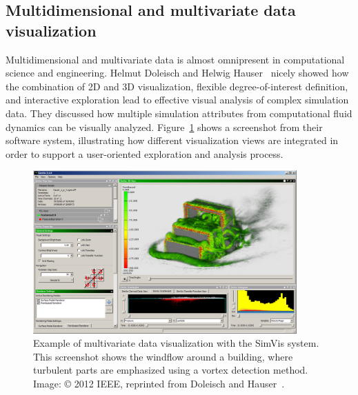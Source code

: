\documentclass[10pt,journal,compsoc]{IEEEtran}
\begin{document}
\subsection*{Multidimensional and multivariate data visualization}

Multidimensional and multivariate data is almost omnipresent in computational science and engineering. 
Helmut Doleisch and Helwig Hauser~\cite{Doleisch2012} nicely showed how the combination of 2D and 3D visualization, flexible degree-of-interest definition, and interactive exploration lead to effective visual analysis of complex simulation data. They discussed how multiple simulation attributes from computational fluid dynamics can be visually analyzed. Figure~\ref{fig:simvis} shows a screenshot from their software system, illustrating how different visualization views are integrated in order to support a user-oriented exploration and analysis process.

\begin{figure}
    \begin{center}    
        \includegraphics[width=0.9\textwidth]{simvis.png}
        \caption{Example of multivariate data visualization with the SimVis system. This screenshot shows the windflow around a building, where turbulent parts are emphasized using a vortex detection method. Image: \copyright{} 2012 IEEE, reprinted from Doleisch and Hauser~\cite{Doleisch2012}.
  \label{fig:simvis}}        
    \end{center}
\end{figure}
\end{document}
